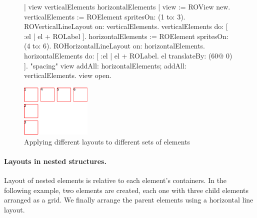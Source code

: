 \documentclass[a4paper,10pt,twoside]{book}
\begin{document}
\begin{figure}[H]
\label{fig:differentLayouts}
\vspace{0pt}
	\begin{minipage}[t]{1\textwidth}
     \begin{code}{}
| view verticalElements horizontalElements |
view := ROView new.
verticalElements := ROElement spritesOn: (1 to: 3).
ROVerticalLineLayout on: verticalElements.
verticalElements do: [ :el | el + ROLabel ].
horizontalElements := ROElement spritesOn: (4 to: 6).
ROHorizontalLineLayout on: horizontalElements.
horizontalElements do: [ :el |
	el + ROLabel.
	el translateBy: (60@ 0) ].	  "spacing"
view 
	addAll: horizontalElements; 
	addAll: verticalElements.
view open.
  \end{code}
   \end{minipage}  

\hfill
   \begin{minipage}[t]{1\textwidth}
      \vspace{0pt} \raggedright
       \centering
		\includegraphics[width=0.3\textwidth]{differentLayouts} 
   \end{minipage}
\caption{Applying different layouts to different sets of elements}
\end{figure} 



\paragraph{Layouts in nested structures.}
Layout of nested elements is relative to each element's containers. In the following example, two elements are created, each one with three child elements arranged as a grid. We finally arrange the parent elements using a horizontal line layout.
\end{document}
